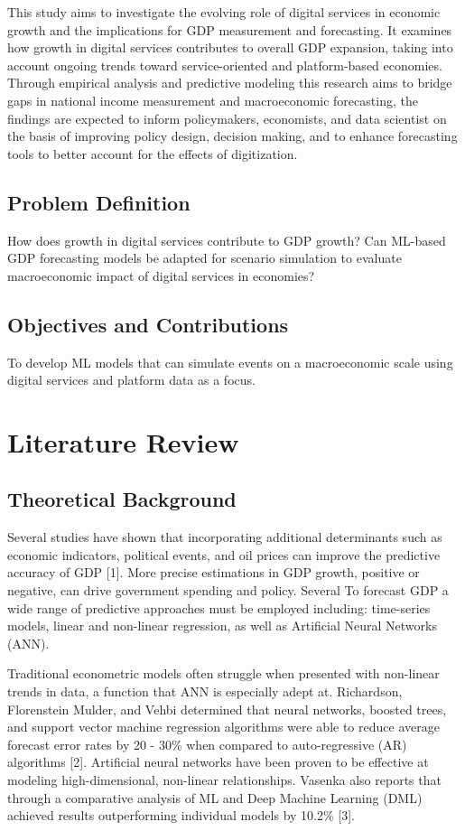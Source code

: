 \documentclass[12pt]{article}
\begin{document}
        This study aims to investigate the evolving role of digital services in economic growth and the implications for GDP measurement and forecasting. It examines how growth in digital services contributes to overall GDP expansion, taking into account ongoing trends toward service-oriented and platform-based economies. Through empirical analysis and predictive modeling this research aims to bridge gaps in national income measurement and macroeconomic forecasting, the findings are expected to inform policymakers, economists, and data scientist on the basis of improving policy design, decision making, and to enhance forecasting tools to better account for the effects of digitization.
    \subsection*{Problem Definition}
        How does growth in digital services contribute to GDP growth?
        Can ML-based GDP forecasting models be adapted for scenario simulation to evaluate macroeconomic impact of digital services in economies?
    \subsection*{Objectives and Contributions}
        To develop ML models that can simulate events on a macroeconomic scale using digital services and platform data as a focus.

\section{Literature Review}
    \subsection*{Theoretical Background}
        
        Several studies have shown that incorporating additional determinants
such as economic indicators, political events, and oil prices
can improve the predictive accuracy of GDP [1]. More precise estimations in GDP growth, positive or negative, can drive government spending and policy. Several To forecast GDP a wide range of predictive approaches must be employed including: time-series models, linear and non-linear regression, as well as Artificial Neural Networks (ANN). 
        
        Traditional econometric models often struggle when presented with non-linear trends in data, a function that ANN is especially adept at. Richardson, Florenstein Mulder, and Vehbi determined that neural networks, boosted trees, and support vector machine regression algorithms were able to reduce average forecast error rates by 20 - 30\% when compared to auto-regressive (AR) algorithms [2]. Artificial neural networks have been proven to be effective at modeling high-dimensional, non-linear relationships. Vasenka also reports that through a comparative analysis of ML and Deep Machine Learning (DML) achieved results outperforming individual models by 10.2\% [3].
        
\end{document}
